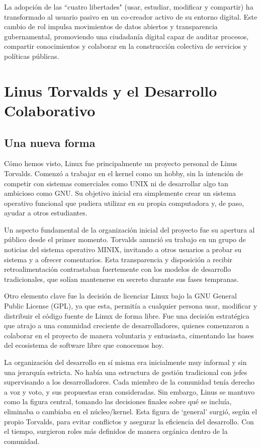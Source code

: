 \documentclass[a4paper,12pt]{article}
\begin{document}
La adopción de las ``cuatro libertades" (usar, estudiar, modificar y compartir)
ha transformado al usuario pasivo en un co-creador activo de su entorno digital.
Este cambio de rol impulsa movimientos de datos abiertos y transparencia
gubernamental, promoviendo una ciudadanía digital capaz de auditar procesos,
compartir conocimientos y colaborar en la construcción colectiva de servicios y
políticas públicas.

\section{Linus Torvalds y el Desarrollo Colaborativo}

\subsection{Una nueva forma}

Cómo hemos visto, Linux fue principalmente un proyecto personal de Linus Torvalds.
Comenzó a trabajar en el kernel como un hobby, sin la intención de competir con
sistemas comerciales como UNIX ni de desarrollar algo tan ambicioso como GNU. Su
objetivo inicial era simplemente crear un sistema operativo funcional que
pudiera utilizar en su propia computadora y, de paso, ayudar a otros
estudiantes.

Un aspecto fundamental de la organización inicial del proyecto fue su apertura
al público desde el primer momento. Torvalds anunció su trabajo en un grupo de
noticias del sistema operativo MINIX, invitando a otros usuarios a probar su
sistema y a ofrecer comentarios. Esta transparencia y disposición a recibir
retroalimentación contrastaban fuertemente con los modelos de desarrollo
tradicionales, que solían mantenerse en secreto durante sus fases tempranas.

Otro elemento clave fue la decisión de licenciar Linux bajo la GNU General
Public License (GPL), ya que esta, permitía a cualquier persona usar, modificar
y distribuir el código fuente de Linux de forma libre. Fue una decisión
estratégica que atrajo a una comunidad creciente de desarrolladores, quienes
comenzaron a colaborar en el proyecto de manera voluntaria y entusiasta,
cimentando las bases del ecosistema de software libre que conocemos hoy.

La organización del desarrollo en sí misma era inicialmente muy informal y sin
una jerarquía estricta. No había una estructura de gestión tradicional con jefes
supervisando a los desarrolladores. Cada miembro de la comunidad tenía derecho a
voz y voto, y sus propuestas eran consideradas. Sin embargo, Linus se
mantuvo como la figura central, tomando las decisiones finales sobre qué se
incluía, eliminaba o cambiaba en el núcleo/kernel. Esta figura de `general'
surgió, según el propio Torvalds, para evitar conflictos y asegurar la
eficiencia del desarrollo.  Con el tiempo, surgieron roles más definidos de
manera orgánica dentro de la comunidad.
\end{document}
